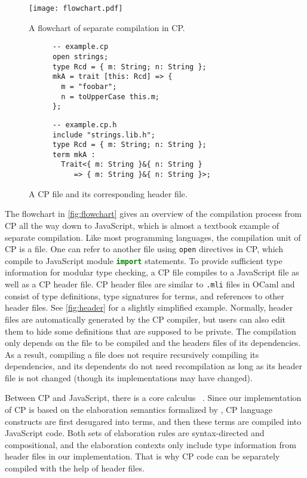 \begin{figure}
\texttt{[image: flowchart.pdf]}
\caption{A flowchart of separate compilation in CP.} \label{fig:flowchart}
\end{figure}

\begin{figure}
\begin{subfigure}[t]{.5\textwidth}
\begin{lstlisting}
-- example.cp
open strings;
type Rcd = { m: String; n: String };
mkA = trait [this: Rcd] => {
  m = "foobar";
  n = toUpperCase this.m;
};
\end{lstlisting}
\end{subfigure}%
\begin{subfigure}[t]{.5\textwidth}
\begin{lstlisting}[morekeywords={include,term}]
-- example.cp.h
include "strings.lib.h";
type Rcd = { m: String; n: String };
term mkA :
  Trait<{ m: String }&{ n: String }
     => { m: String }&{ n: String }>;
\end{lstlisting}
\end{subfigure}
\caption{A CP file and its corresponding header file.} \label{fig:header}
\end{figure}

The flowchart in \autoref{fig:flowchart} gives an overview of the compilation
process from CP all the way down to JavaScript, which is almost a textbook
example of separate compilation. Like most programming languages, the
compilation unit of CP is a file. One can refer to another file using
\lstinline{open} directives in CP, which compile to JavaScript module
\lstinline[language=TypeScript]{import} statements. To provide sufficient type
information for modular type checking, a CP file compiles to a JavaScript file
as well as a CP header file. CP header files are similar to \lstinline{.mli}
files in OCaml and consist of type definitions, type signatures for terms, and
references to other header files. See \autoref{fig:header} for a slightly
simplified example. Normally, header files are automatically generated by the CP
compiler, but users can also edit them to hide some definitions that are
supposed to be private. The compilation only depends on the file to be compiled
and the headers files of its dependencies. As a result, compiling a file does
not require recursively compiling its dependencies, and its dependents do not
need recompilation as long as its header file is not changed (though its
implementations may have changed).

Between CP and JavaScript, there is a core calculus
\fiplus~\citep{bi2019distributive,fan2022direct}. Since our implementation of CP
is based on the elaboration semantics formalized by
\citet{zhang2021compositional}, CP language constructs are first desugared into
\fiplus terms, and then these \fiplus terms are compiled into JavaScript code.
Both sets of elaboration rules are syntax-directed and compositional, and the
elaboration contexts only include type information from header files in our
implementation. That is why CP code can be separately compiled with the help of
header files.
